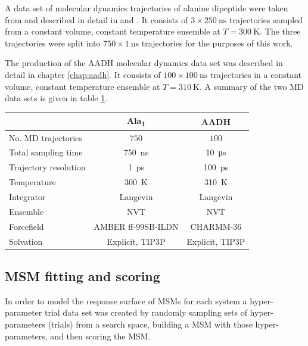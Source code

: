  A data set of molecular dynamics trajectories of alanine dipeptide were taken from \cite{wehmeyerTimelaggedAutoencodersDeep2018a} and described in detail in \cite{nuskeMarkovStateModels2017b} and \cite{harveyACEMDAcceleratingBiomolecular2009}.  It consists of $3\times \SI{250}{\nano\second}$ trajectories sampled from a constant volume, constant temperature ensemble at $T=\SI{300}{\kelvin}$. The three trajectories were split into $750\times\SI{1}{\nano\second}$ trajectories for the purposes of this work. 
 
The production of the AADH molecular dynamics data set was described in detail in chapter \ref{chap:aadh}.  It consists of $100\times \SI{100}{\nano\second}$ trajectories in a constant volume, constant temperature ensemble at $T=\SI{310}{\kelvin}$. A summary of the two MD data sets is given in table \ref{tab:md_specs}. 

\begin{table}
    \centering
    \begin{tabular}{|l|c|c|}
        \hline
         & Ala\textsubscript{1} & AADH \\
         \hline\hline
         No. MD trajectories & $750$ & $100$ \\
         Total sampling time & \SI{750}{\nano\second} & \SI{10}{\micro\second} \\
         Trajectory resolution & \SI{1}{\pico\second} & \SI{100}{\pico\second} \\
         Temperature & \SI{300}{\kelvin} & \SI{310}{\kelvin} \\
         Integrator & Langevin & Langevin \\
         Ensemble & NVT & NVT \\
         Forcefield & AMBER ff-99SB-ILDN & CHARMM-36 \\
         Solvation & Explicit, TIP3P & Explicit, TIP3P \\
         \hline
    \end{tabular}
    \label{tab:md_specs}
\end{table}

\subsection{MSM fitting and scoring}\label{subsec:msm_fitting}
In order to  model the response surface of MSMs for each system a  hyper-parameter trial data set was created by randomly sampling sets of hyper-parameters (trials) from a search space, building a MSM with those hyper-parameters, and then scoring the MSM. 

